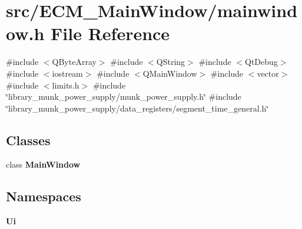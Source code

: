 \section{src/\+E\+C\+M\+\_\+\+Main\+Window/mainwindow.h File Reference}
\label{_e_c_m___main_window_2mainwindow_8h}
{\ttfamily \#include $<$Q\+Byte\+Array$>$}\newline
{\ttfamily \#include $<$Q\+String$>$}\newline
{\ttfamily \#include $<$Qt\+Debug$>$}\newline
{\ttfamily \#include $<$iostream$>$}\newline
{\ttfamily \#include $<$Q\+Main\+Window$>$}\newline
{\ttfamily \#include $<$vector$>$}\newline
{\ttfamily \#include $<$limits.\+h$>$}\newline
{\ttfamily \#include \char`\"{}library\+\_\+munk\+\_\+power\+\_\+supply/munk\+\_\+power\+\_\+supply.\+h\char`\"{}}\newline
{\ttfamily \#include \char`\"{}library\+\_\+munk\+\_\+power\+\_\+supply/data\+\_\+registers/segment\+\_\+time\+\_\+general.\+h\char`\"{}}\newline
\subsection*{Classes}
\begin{DoxyCompactItemize}
\item 
class \textbf{ Main\+Window}
\end{DoxyCompactItemize}
\subsection*{Namespaces}
\begin{DoxyCompactItemize}
\item 
 \textbf{ Ui}
\end{DoxyCompactItemize}

